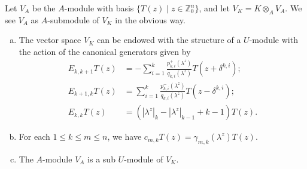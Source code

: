 \documentclass[11pt,fleqn]{article}
\newcommand\ZZ{\mathbb Z}
\newcommand\ot{\otimes}
\begin{document}
\begin{Proposition}
Let $V_A$ be the $A$-module with basis $\{T(z) \mid z \in \ZZ^n_0\}$, and let 
$V_K = K \ot_A V_A$. We see $V_A$ as $A$-submodule of $V_K$ in the obvious way.

\begin{enumerate}[(a)]
\item \label{generic-GT-structure}
The vector space $V_K$ can be endowed with the structure of a $U$-module 
with the action of the canonical generators given by
\begin{align*}
E_{k,k+1} T(z) 
	&= - \sum_{i=1}^k \frac{p^+_{k,i}(\lambda^z)}{q_{k,i}(\lambda^z)} 
		T(z + \delta^{k,i}); \\
E_{k+1,k} T(z) 
	&= \sum_{i=1}^k \frac{p^-_{k,i}(\lambda^z)}{q_{k,i}(\lambda^z)} 
		T(z - \delta^{k,i}); \\
E_{k,k} T(z)
	&= (|\lambda^z|_k - |\lambda^z|_{k-1} + k -1) T(z).
\end{align*}

\item For each $1 \leq k \leq m \leq n$, we have $c_{m,k} T(z) = 
\gamma_{m,k}(\lambda^z) T(z)$.

\item The $A$-module $V_A$ is a sub $U$-module of $V_K$.
\end{enumerate}
\end{Proposition}
\end{document}
